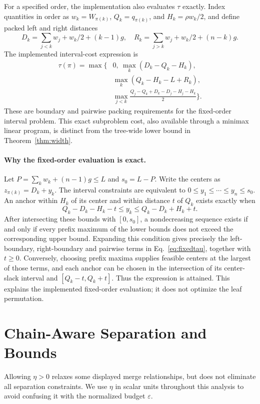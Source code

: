 \documentclass[10pt]{article}
\begin{document}
For a specified order, the implementation also evaluates $\tau$ exactly. Index quantities in order as $w_k=W_{\pi(k)}$, $Q_k=q_{\pi(k)}$, and $H_k=\rho w_k/2$, and define packed left and right distances
\[
 D_k=\sum_{j<k}w_j+w_k/2+(k-1)g,\quad
 R_k=\sum_{j>k}w_j+w_k/2+(n-k)g.
\]
The implemented interval-cost expression is
\begin{equation}\label{eq:fixedtau}
\begin{split}
\tau(\pi)=\max\bigg\{&0,\ \max_k(D_k-Q_k-H_k),\\
 &\max_k(Q_k-H_k-L+R_k),\\
 &\max_{j<k}\frac{Q_j-Q_k+D_k-D_j-H_j-H_k}{2}\bigg\}.
\end{split}
\end{equation}
These are boundary and pairwise packing requirements for the fixed-order interval problem. This exact subproblem cost, also available through a minimax linear program, is distinct from the tree-wide lower bound in Theorem~\ref{thm:width}.

\paragraph{Why the fixed-order evaluation is exact.}
Let $P=\sum_k w_k+(n-1)g\le L$ and $s_0=L-P$. Write the centers as $z_{\pi(k)}=D_k+y_k$. The interval constraints are equivalent to $0\le y_1\le\cdots\le y_n\le s_0$. An anchor within $H_k$ of its center and within distance $t$ of $Q_k$ exists exactly when
\[
 Q_k-D_k-H_k-t\le y_k\le Q_k-D_k+H_k+t.
\]
After intersecting these bounds with $[0,s_0]$, a nondecreasing sequence exists if and only if every prefix maximum of the lower bounds does not exceed the corresponding upper bound. Expanding this condition gives precisely the left-boundary, right-boundary and pairwise terms in Eq.~\ref{eq:fixedtau}, together with $t\ge0$. Conversely, choosing prefix maxima supplies feasible centers at the largest of those terms, and each anchor can be chosen in the intersection of its center-slack interval and $[Q_k-t,Q_k+t]$. Thus the expression is attained. This explains the implemented fixed-order evaluation; it does not optimize the leaf permutation.


\section{Chain-Aware Separation and Bounds}\label{sec:chain}
Allowing $\eta>0$ relaxes some displayed merge relationships, but does not eliminate all separation constraints. We use $\eta$ in scalar units throughout this analysis to avoid confusing it with the normalized budget $\varepsilon$.
\end{document}
